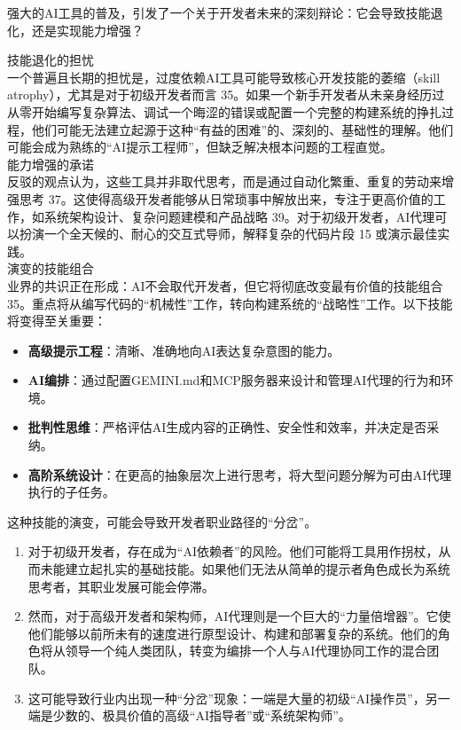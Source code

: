 \documentclass[a4paper,12pt]{article}
\providecommand{\tightlist}{%
  \setlength{\itemsep}{0pt}\setlength{\parskip}{0pt}}
\begin{document}
\begin{multicols}{2}
    强大的AI工具的普及，引发了一个关于开发者未来的深刻辩论：它会导致技能退化，还是实现能力增强？

    技能退化的担忧\\
    一个普遍且长期的担忧是，过度依赖AI工具可能导致核心开发技能的萎缩（skill
    atrophy），尤其是对于初级开发者而言
    35。如果一个新手开发者从未亲身经历过从零开始编写复杂算法、调试一个晦涩的错误或配置一个完整的构建系统的挣扎过程，他们可能无法建立起源于这种``有益的困难''的、深刻的、基础性的理解。他们可能会成为熟练的``AI提示工程师''，但缺乏解决根本问题的工程直觉。\\
    能力增强的承诺\\
    反驳的观点认为，这些工具并非取代思考，而是通过自动化繁重、重复的劳动来增强思考
    37。这使得高级开发者能够从日常琐事中解放出来，专注于更高价值的工作，如系统架构设计、复杂问题建模和产品战略
    39。对于初级开发者，AI代理可以扮演一个全天候的、耐心的交互式导师，解释复杂的代码片段
    15 或演示最佳实践。\\
    演变的技能组合\\
    业界的共识正在形成：AI不会取代开发者，但它将彻底改变最有价值的技能组合
    35。重点将从编写代码的``机械性''工作，转向构建系统的``战略性''工作。以下技能将变得至关重要：

    \begin{itemize}
    \tightlist
    \item
      \textbf{高级提示工程}：清晰、准确地向AI表达复杂意图的能力。\\
    \item
      \textbf{AI编排}：通过配置GEMINI.md和MCP服务器来设计和管理AI代理的行为和环境。\\
    \item
      \textbf{批判性思维}：严格评估AI生成内容的正确性、安全性和效率，并决定是否采纳。\\
    \item
      \textbf{高阶系统设计}：在更高的抽象层次上进行思考，将大型问题分解为可由AI代理执行的子任务。
    \end{itemize}

    这种技能的演变，可能会导致开发者职业路径的``分岔''。

    \begin{enumerate}
    \def\labelenumi{\arabic{enumi}.}
    \tightlist
    \item
      对于初级开发者，存在成为``AI依赖者''的风险。他们可能将工具用作拐杖，从而未能建立起扎实的基础技能。如果他们无法从简单的提示者角色成长为系统思考者，其职业发展可能会停滞。\\
    \item
      然而，对于高级开发者和架构师，AI代理则是一个巨大的``力量倍增器''。它使他们能够以前所未有的速度进行原型设计、构建和部署复杂的系统。他们的角色将从领导一个纯人类团队，转变为编排一个人与AI代理协同工作的混合团队。\\
    \item
      这可能导致行业内出现一种``分岔''现象：一端是大量的初级``AI操作员''，另一端是少数的、极具价值的高级``AI指导者''或``系统架构师''。
    \end{enumerate}


\end{multicols}
\end{document}
